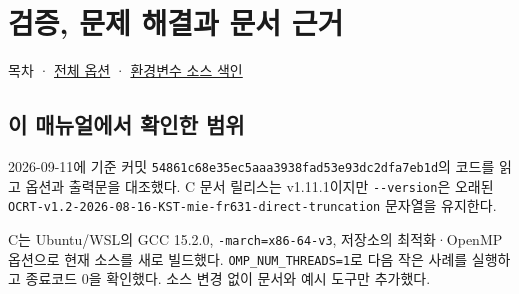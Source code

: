 \chapter{검증, 문제 해결과 문서 근거}
\label{chap:07_validation_notes}
\begingroup
\setlength{\parskip}{3pt}
목차 · \hyperref[chap:03_options]{전체 옵션} · \hyperref[chap:03_environment_index]{환경변수 소스 색인}

\section{이 매뉴얼에서 확인한 범위}
\label{sec:auto:07_validation_notes:1}
2026-09-11에 기준 커밋 \texttt{54861c68e35ec5aa\allowbreak{}a3938fad53e93dc2\allowbreak{}dfa7eb1d}의 코드를 읽고 옵션과 출력문을 대조했다. C 문서 릴리스는 v1.11.1이지만 \texttt{-\allowbreak{}-\allowbreak{}version}은 오래된 \texttt{OCRT-\allowbreak{}v1.\allowbreak{}2-\allowbreak{}2026-\allowbreak{}08-\allowbreak{}16-\allowbreak{}KST-\allowbreak{}mie-\allowbreak{}fr631-\allowbreak{}direct-\allowbreak{}truncation} 문자열을 유지한다.

C는 Ubuntu/WSL의 GCC 15.2.0, \texttt{-\allowbreak{}march=\allowbreak{}x86-\allowbreak{}64-\allowbreak{}v3}, 저장소의 최적화·OpenMP 옵션으로 현재 소스를 새로 빌드했다. \texttt{OMP\_\allowbreak{}NUM\_\allowbreak{}THREADS=\allowbreak{}1}로 다음 작은 사례를 실행하고 종료코드 0을 확인했다. 소스 변경 없이 문서와 예시 도구만 추가했다.


